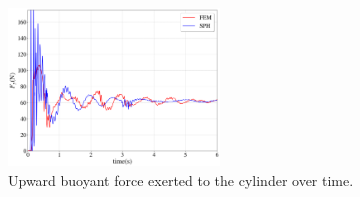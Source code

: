 \begin{figure}[H]
	\begin{center}
		\includegraphics[width=0.5\textwidth]{images/FSI_Comparison/Figure_Cylinder_FSI.png}
	\end{center}
	\caption{Upward buoyant force exerted to the cylinder over time.}
	\label{fig:CD_F}
\end{figure}

